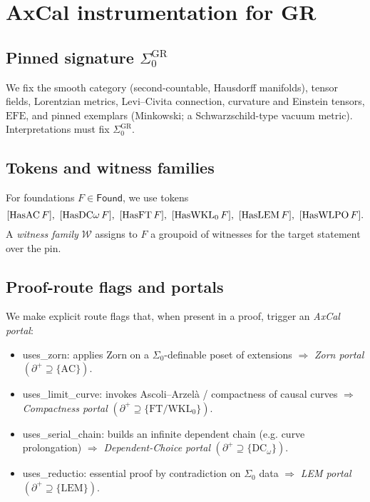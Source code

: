 \documentclass[11pt]{article}
\theoremstyle{definition}
\theoremstyle{remark}
\newcommand{\LEM}{\mathrm{LEM}}
\newcommand{\FT}{\mathrm{FT}}
\newcommand{\WKLz}{\mathrm{WKL}_0}
\newcommand{\AC}{\mathrm{AC}}
\newcommand{\DCw}{\mathrm{DC}_\omega}
\newcommand{\Found}{\mathsf{Found}}
\newcommand{\SigmaZero}{\Sigma_{0}}
\newcommand{\Frontierpos}{\partial^{+}}
\newcommand{\EFE}{\mathrm{EFE}} %
\begin{document}
\tableofcontents

\section{AxCal instrumentation for GR}
\subsection{Pinned signature \texorpdfstring{$\Sigma_0^{\mathrm{GR}}$}{Sigma0-GR}}
We fix the smooth category (second-countable, Hausdorff manifolds), tensor fields, Lorentzian metrics, Levi--Civita connection, curvature and Einstein tensors, $\EFE$, and pinned exemplars (Minkowski; a Schwarzschild-type vacuum metric). Interpretations must fix $\SigmaZero^{\mathrm{GR}}$.

\subsection{Tokens and witness families}
For foundations $F\in\Found$, we use tokens
\[
[{\rm HasAC}\,F],\ [{\rm HasDC}\omega\,F],\ [{\rm HasFT}\,F],\ [{\rm HasWKL}_0\,F],\ [{\rm HasLEM}\,F],\ [{\rm HasWLPO}\,F].
\]
A \emph{witness family} $\mathcal{W}$ assigns to $F$ a groupoid of witnesses for the target statement over the pin.

\subsection{Proof-route flags and portals}
We make explicit route flags that, when present in a proof, trigger an \emph{AxCal portal}:
\begin{itemize}
\item \textsf{uses\_zorn}: applies Zorn on a $\SigmaZero$-definable poset of extensions $\Rightarrow$ \emph{Zorn portal} $(\Frontierpos\supseteq\{\AC\})$.
\item \textsf{uses\_limit\_curve}: invokes Ascoli--Arzelà / compactness of causal curves $\Rightarrow$ \emph{Compactness portal} $(\Frontierpos\supseteq\{\FT/\WKLz\})$.
\item \textsf{uses\_serial\_chain}: builds an infinite dependent chain (e.g. curve prolongation) $\Rightarrow$ \emph{Dependent-Choice portal} $(\Frontierpos\supseteq\{\DCw\})$.
\item \textsf{uses\_reductio}: essential proof by contradiction on $\SigmaZero$ data $\Rightarrow$ \emph{LEM portal} $(\Frontierpos\supseteq\{\LEM\})$.
\end{itemize}
\end{document}
